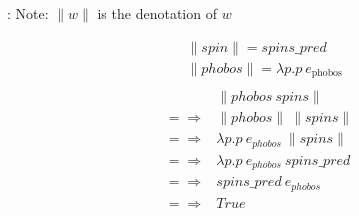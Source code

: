 \documentclass[logoontitle,tabu,supertabular,aspectratio=43]{preney-uwindsor-beamer}
\newcommand{\phobos}{\mathit{phobos}}
\newcommand{\spins}{\mathit{spins}}
\newcommand{\spin}{\mathit{spin}}
\newcommand{\meaningof}[1]{\lVert #1 \rVert}
\newcommand{\entityassoc}[1]{e_{#1}}
\newcommand{\wordpred}[1]{\mathit{#1\_pred}}
\newcommand{\True}{\mathit{True}}
\begin{document}
    \begin{frame}{\insertsection: \insertsubsection}
        \centering
        Note: $\meaningof{w}$ is the denotation of $w$

        \begin{equation*}
            \begin{split}
                &\meaningof{\spin} = \wordpred{\spins} \\
                &\meaningof{\phobos} = \lambda p. p\ e_\mathrm{phobos} \\
            \end{split}
        \end{equation*}
        \begin{equation*}
            \begin{split}
                & \meaningof{\phobos \ \spins} \\
                =\!\Rightarrow&  \meaningof{\phobos}\ \meaningof{\spins} \\
                =\!\Rightarrow&  \lambda p. p \ \entityassoc{phobos} \ \meaningof{\spins} \\
                =\!\Rightarrow&  \lambda p. p \ \entityassoc{phobos} \ \wordpred{\spins}\\
                =\!\Rightarrow&  \wordpred{\spins} \ \entityassoc{phobos} \\
                =\!\Rightarrow&  \True
            \end{split}
        \end{equation*}

    \end{frame}
\end{document}
